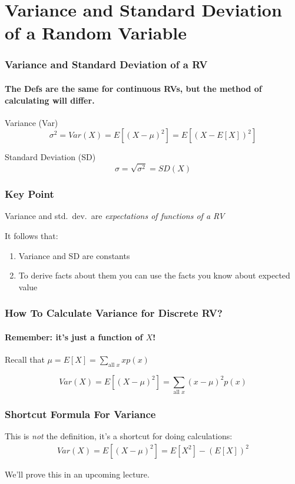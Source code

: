 \section{Variance and Standard Deviation of a Random Variable}

\begin{frame}
\frametitle{Variance and Standard Deviation of a RV}
\framesubtitle{The Defs are the same for continuous RVs, but the method of calculating will differ.}

\begin{block}{Variance (Var)}
	$$\sigma^2 = Var(X) = E\left[ (X - \mu)^2\right] = E\left[ (X - E[X])^2\right]$$
\end{block}


\begin{block}{Standard Deviation (SD)}
$$\sigma = \sqrt{\sigma^2} = SD(X)$$
\end{block}


\end{frame}
\begin{frame}
\frametitle{Key Point}

\alert{Variance and std.\ dev.\ are \emph{expectations of functions of a RV}} 

\vspace{1em}

It follows that: 
\begin{enumerate}
\item Variance and SD are constants
\item To derive facts about them you can use the facts you know about expected value
\end{enumerate}
\end{frame}
\begin{frame}
\frametitle{How To Calculate Variance for Discrete RV?}
\framesubtitle{Remember: it's just a function of $X$!}


Recall that	$\displaystyle \mu = E[X] = \sum_{\mbox{all } x} xp(x)$


\vspace{3em}

$$Var(X) = E\left[ (X - \mu)^2 \right] =\sum_{\mbox{all } x} (x - \mu)^2 p(x)$$


\end{frame}
\begin{frame}
\frametitle{Shortcut Formula For Variance}

This is \emph{not} the definition, it's a shortcut for doing calculations:
\begin{eqnarray*}
	Var(X) = E\left[ (X - \mu)^2 \right] = E[X^2] - \left(E[X]\right)^2
\end{eqnarray*}

\alert{We'll prove this in an upcoming lecture.}

\end{frame}

